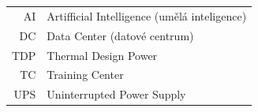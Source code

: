 \documentclass[czech,bachelor,oneside, draft]{ctufit-thesis}
\begin{document}
\chapter{\thectufitabbreviationlabel}

\begin{tabular}{rl}
    AI    & Artifficial Intelligence (umělá inteligence)  \\
	DC    & Data Center (datové centrum) \\
    TDP     & Thermal Design Power \\
    TC      & Training Center \\
    UPS     & Uninterrupted Power Supply
	
\end{tabular}
\resumeTOCentries
\mainmatter\mainmatterinit %







\appendix\appendixinit %


\backmatter %

\printbibliography[heading=bibintoc] %

\end{document}
